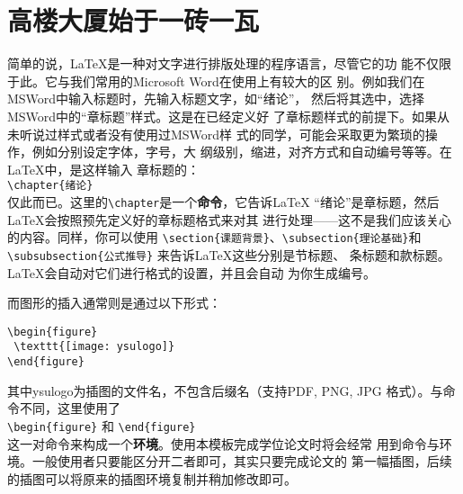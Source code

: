 \section{高楼大厦始于一砖一瓦}\label{section1-1}
简单的说，\LaTeX 是一种对文字进行排版处理的程序语言，尽管它的功
能不仅限于此。它与我们常用的Microsoft Word在使用上有较大的区
别。例如我们在MSWord中输入标题时，先输入标题文字，如“绪论”，
然后将其选中，选择MSWord中的“章标题”样式。这是在已经定义好
了章标题样式的前提下。如果从未听说过样式或者没有使用过MSWord样
式的同学，可能会采取更为繁琐的操作，例如分别设定字体，字号，大
纲级别，缩进，对齐方式和自动编号等等。在\LaTeX 中，是这样输入
章标题的：\\[2pt]
\hspace*{5cm}\verb|\chapter{绪论}|\\[2pt]
仅此而已。这里的\verb|\chapter|是一个\textbf{命令}，它告诉\LaTeX
“绪论”是章标题，然后\LaTeX 会按照预先定义好的章标题格式来对其
进行处理——这不是我们应该关心的内容。同样，你可以使用
\verb|\section{课题背景}|、\verb|\subsection{理论基础}|和
\verb|\subsubsection{公式推导}|
来告诉\LaTeX 这些分别是节标题、
条标题和款标题。\LaTeX 会自动对它们进行格式的设置，并且会自动
为你生成编号。

而图形的插入通常则是通过以下形式：
\begin{verbatim}
\begin{figure}
 \texttt{[image: ysulogo]}
\end{figure}
\end{verbatim}
其中ysulogo为插图的文件名，不包含后缀名（\XeLaTeX 支持PDF, PNG, JPG 格式）。与命令不同，这里使用了\\
\verb|\begin{figure}|
和
\verb|\end{figure}|\\
这一对命令来构成一个\textbf{环境}。使用本模板完成学位论文时将会经常
用到命令与环境。一般使用者只要能区分开二者即可，其实只要完成论文的
第一幅插图，后续的插图可以将原来的插图环境复制并稍加修改即可。

